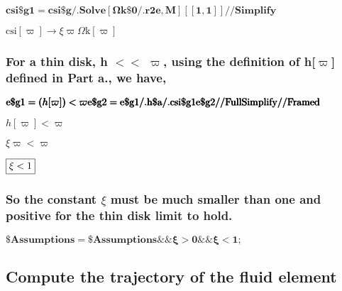 \documentclass{article}
\begin{document}
\begin{doublespace}
\noindent\(\pmb{\text{csi$\$$g1}= \text{csi$\$$g}\text{/.} \text{Solve}[\text{$\Omega $k$\$$0}\text{/.} \text{r2e}, M][[1,1]] \text{//}\text{Simplify}}\)
\end{doublespace}

\begin{doublespace}
\noindent\(\text{csi}[\varpi ]\to \xi  \varpi  \text{$\Omega $k}[\varpi ]\)
\end{doublespace}

\subsubsection*{For a thin disk, h $<<$ $\varpi $, using the definition of h[$\varpi $] defined in Part a., we have,}

\begin{doublespace}
\noindent\(\pmb{\text{e$\$$g1} =(h[\varpi ] ) < \varpi  }\\
\pmb{\text{e$\$$g2} = \text{e$\$$g1} \text{/.} \text{h$\$$a} \text{/.} \text{csi$\$$g1}}\\
\pmb{\text{e$\$$g2} \text{//}\text{FullSimplify} \text{//}\text{Framed}}\)
\end{doublespace}

\begin{doublespace}
\noindent\(h[\varpi ]<\varpi\)
\end{doublespace}

\begin{doublespace}
\noindent\(\xi  \varpi <\varpi\)
\end{doublespace}

\begin{doublespace}
\noindent\(\fbox{$\xi <1$}\)
\end{doublespace}

\subsubsection*{So the constant $\xi $ must be much smaller than one and positive for the thin disk limit to hold.}

\begin{doublespace}
\noindent\(\pmb{\text{$\$$Assumptions} = \text{$\$$Assumptions} \&\& \xi  >0 \&\& \xi  < 1;}\)
\end{doublespace}

\subsection*{Compute the trajectory of the fluid element}
\end{document}
